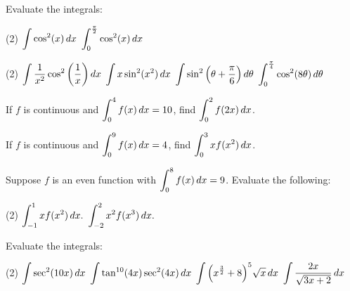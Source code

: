 \documentclass[mathNotesPreamble]{subfiles}
\begin{document}
  \begin{center}
  \end{center}
  \begin{ex*}
    Evaluate the integrals:
  \end{ex*}
  \begin{tasks}[after-item-skip=\stretch{1}](2)
    \task $\displaystyle\int \cos^2(x)\,dx$
    \task $\displaystyle\int_{0}^{\frac{\pi}{2}}\cos^2(x)\,dx$
  \end{tasks}
  \pagebreak
  
  \begin{tasks}[after-item-skip=\stretch{1}, resume](2)
    \task $\displaystyle\int \frac{1}{x^2}\cos^2{\left(\frac{1}{x}\right)}\,dx$
    \task $\displaystyle\int x\sin^2(x^2)\,dx$
    \task $\displaystyle\int \sin^2{\left(\theta+\frac{\pi}{6}\right)}\,d\theta$
    \task $\displaystyle\int_{0}^{\frac{\pi}{4}} \cos^2(8\theta)\,d\theta$
  \end{tasks}
  \pagebreak
  
  \begin{ex*}
    If $f$ is continuous and $\displaystyle\int_0^4 f(x)\,dx=10$, find $\displaystyle\int_0^2 f(2x)\,dx$.
  \end{ex*}
  
  \begin{ex*}
    If $f$ is continuous and $\displaystyle\int_0^9 f(x)\,dx=4$, find $\displaystyle\int_0^3 xf(x^2)\,dx$.
  \end{ex*}
  
  \begin{ex*}
    Suppose $f$ is an even function with $\displaystyle\int_0^8 f(x)\,dx=9$. Evaluate the following:
  \end{ex*}
  \begin{tasks}(2)
    \task $\displaystyle\int_{-1}^1 x f(x^2)\,dx.$
    \task $\displaystyle\int_{-2}^2 x^2 f(x^3)\,dx.$
  \end{tasks}
  \pagebreak
  
  \begin{ex*}
    Evaluate the integrals:
  \end{ex*}
  \begin{tasks}[after-item-skip=\stretch{1}](2)
    \task $\displaystyle\int \sec^2(10x)\,dx$
    \task $\displaystyle\int \tan^{10}(4x)\sec^2(4x)\,dx$
    \task $\displaystyle\int{\left(x^\frac{3}{2}+8\right)}^5\sqrt{x}\,dx$
    \task $\displaystyle\int \frac{2x}{\sqrt{3x+2}}\,dx$
  \end{tasks}
  \pagebreak
  
\end{document}
